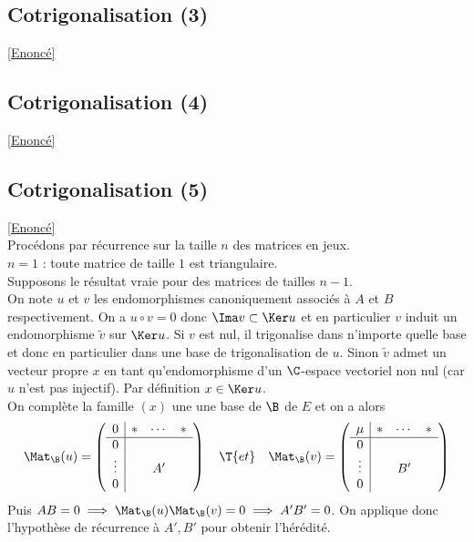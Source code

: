 \documentclass[8pt]{book}
\begin{document}
	\subsection{Cotrigonalisation (3) }
	\label{Cotrigonalisation (3) corrigé}
	\textcolor{blue}{\hyperref[Cotrigonalisation (3)]{[Enoncé]}}\\
	
	\subsection{Cotrigonalisation (4) }
	\label{Cotrigonalisation (4) corrigé}
	\textcolor{blue}{\hyperref[Cotrigonalisation (4)]{[Enoncé]}}\\
	
	\subsection{Cotrigonalisation (5) }
	\label{Cotrigonalisation (5) corrigé}
	\textcolor{blue}{\hyperref[Cotrigonalisation (5)]{[Enoncé]}}\\
	Procédons par récurrence sur la taille $n$ des matrices en jeux.\\
	$n=1$ : toute matrice de taille $1$ est triangulaire.\\
	Supposons le résultat vraie pour des matrices de tailles $n-1$.\\
	On note $u$ et $v$ les endomorphismes canoniquement associés à $A$ et $B$ respectivement. On a $u\circ v=0$ donc $\Ima v\subset \Ker u$ et en particulier $v$ induit un endomorphisme $\tilde v$ sur $\Ker u$. Si $v$ est nul, il trigonalise dans n'importe quelle base et donc en particulier dans une base de trigonalisation de $u$. Sinon $\tilde v$ admet un vecteur propre $x$ en tant qu'endomorphisme d'un $\C$-espace vectoriel non nul (car $u$ n'est pas injectif). Par définition $x\in \Ker u$.\\
	On complète la famille $(x)$ une une base de $\B$ de $E$ et on a alors $$\Mat_\B(u)=\left(\begin{array}{c|ccc}
		0&*&\cdots&*\\
		\hline
		0&&&\\
		\vdots&&A'&\\
		0&&&
	\end{array}\right)\quad\T{et}\quad \Mat_\B(v)=\left(\begin{array}{c|ccc}
		\mu&*&\cdots&*\\
		\hline
		0&&&\\
		\vdots&&B'&\\
		0&&&
	\end{array}\right)$$
	Puis $AB=0\implies \Mat_\B(u)\Mat_\B(v)=0\implies A'B'=0$. On applique donc l'hypothèse de récurrence à $A',B'$ pour obtenir l'hérédité.
	
\end{document}
